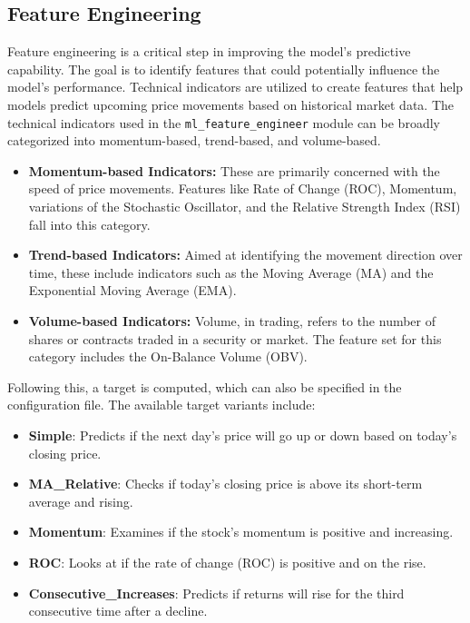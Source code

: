 \subsection{Feature Engineering}
Feature engineering is a critical step in improving the model's predictive capability.
The goal is to identify features that could potentially influence the model's performance.
Technical indicators are utilized to create features that help models predict upcoming price movements based on historical market data.
The technical indicators used in the \texttt{ml\_feature\_engineer} module can be broadly categorized into momentum-based, trend-based, and volume-based.


\begin{itemize}
    \item \textbf{Momentum-based Indicators:} These are primarily concerned with the speed of price movements. Features like Rate of Change (ROC), Momentum, variations of the Stochastic Oscillator, and the Relative Strength Index (RSI) fall into this category.

    \item \textbf{Trend-based Indicators:} Aimed at identifying the movement direction over time, these include indicators such as the Moving Average (MA) and the Exponential Moving Average (EMA).

    \item \textbf{Volume-based Indicators:} Volume, in trading, refers to the number of shares or contracts traded in a security or market. The feature set for this category includes the On-Balance Volume (OBV).
\end{itemize}


Following this, a target is computed, which can also be specified in the configuration file. The available target variants include:
\begin{itemize}
    \item \textbf{Simple}: Predicts if the next day's price will go up or down based on today's closing price.
    \item \textbf{MA\_Relative}: Checks if today's closing price is above its short-term average and rising.
    \item \textbf{Momentum}: Examines if the stock's momentum is positive and increasing.
    \item \textbf{ROC}: Looks at if the rate of change (ROC) is positive and on the rise.
    \item \textbf{Consecutive\_Increases}: Predicts if returns will rise for the third consecutive time after a decline.
\end{itemize}

